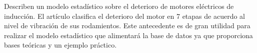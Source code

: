 \textcite{Ramazan} Describen un modelo estadístico sobre el deterioro de
motores eléctricos de inducción. El artículo clasifica el deterioro del motor
en 7 etapas de acuerdo al nivel de vibración de sus rodamientos. Este
antecedente es de gran utilidad para realizar el modelo estadístico que alimentará
la base de datos ya que proporciona bases teóricas y un ejemplo práctico.
